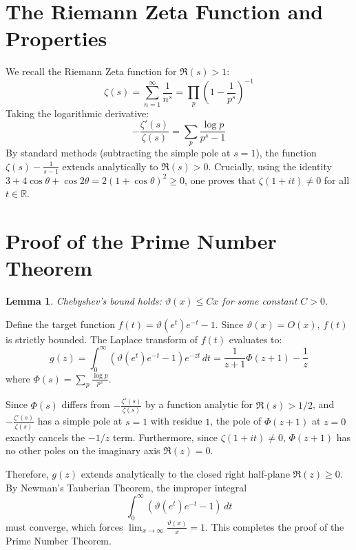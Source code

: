 \documentclass[12pt]{article}
\newtheorem{lemma}{Lemma}
\begin{document}
\section{The Riemann Zeta Function and Properties}
We recall the Riemann Zeta function for $\Re(s) > 1$:
\[ \zeta(s) = \hyperref[layer2:fta]{\sum_{n=1}^\infty \frac{1}{n^s}} = \hyperref[layer2:zeta]{\prod_p \left(1 - \frac{1}{p^s}\right)^{-1}} \]
Taking the logarithmic derivative:
\[ -\frac{\zeta'(s)}{\zeta(s)} = \sum_p \frac{\log p}{p^s - 1} \]
By standard methods (subtracting the simple pole at $s=1$), the function $\zeta(s) - \frac{1}{s-1}$ extends analytically to $\Re(s) > 0$. Crucially, using the identity $3 + 4\cos \theta + \cos 2\theta = 2(1+\cos\theta)^2 \ge 0$, one proves that $\zeta(1+it) \neq 0$ for all $t \in \mathbb{R}$.

\section{Proof of the Prime Number Theorem}

\begin{lemma}
Chebyshev's bound holds: $\vartheta(x) \le Cx$ for some constant $C > 0$.
\end{lemma}

Define the target function $f(t) = \hyperref[layer2:chebyshev]{\vartheta(e^t)e^{-t} - 1}$. Since $\vartheta(x) = O(x)$, $f(t)$ is strictly bounded. 
The Laplace transform of $f(t)$ evaluates to:
\[ g(z) = \int_0^\infty (\vartheta(e^t)e^{-t} - 1) e^{-zt} \, dt = \frac{1}{z+1}\Phi(z+1) - \frac{1}{z} \]
where $\Phi(s) = \sum_p \frac{\log p}{p^s}$. 

Since $\Phi(s)$ differs from $-\frac{\zeta'(s)}{\zeta(s)}$ by a function analytic for $\Re(s) > 1/2$, and $-\frac{\zeta'(s)}{\zeta(s)}$ has a simple pole at $s=1$ with residue $1$, the pole of $\Phi(z+1)$ at $z=0$ exactly cancels the $-1/z$ term.
Furthermore, since $\zeta(1+it) \neq 0$, $\Phi(z+1)$ has no other poles on the imaginary axis $\Re(z) = 0$. 

Therefore, $g(z)$ extends analytically to the closed right half-plane $\Re(z) \ge 0$. By Newman's Tauberian Theorem, the improper integral
\[ \int_0^\infty (\vartheta(e^t)e^{-t} - 1) \, dt \]
must converge, which forces $\lim_{x \to \infty} \frac{\vartheta(x)}{x} = 1$. This completes the proof of the Prime Number Theorem.

\newpage
\appendix
\renewcommand{\thesection}{\Alph{section}}
\end{document}
